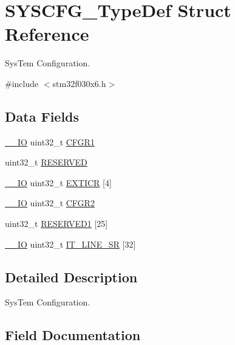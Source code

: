 \hypertarget{struct_s_y_s_c_f_g___type_def}{}\section{S\+Y\+S\+C\+F\+G\+\_\+\+Type\+Def Struct Reference}
\label{struct_s_y_s_c_f_g___type_def}


Sys\+Tem Configuration.  




{\ttfamily \#include $<$stm32f030x6.\+h$>$}

\subsection*{Data Fields}
\begin{DoxyCompactItemize}
\item 
\hyperlink{core__sc300_8h_aec43007d9998a0a0e01faede4133d6be}{\+\_\+\+\_\+\+IO} uint32\+\_\+t \hyperlink{struct_s_y_s_c_f_g___type_def_a7a12ab903dcfa91c96beb2e36562eed6}{C\+F\+G\+R1}
\item 
uint32\+\_\+t \hyperlink{struct_s_y_s_c_f_g___type_def_a0e5030971ec1bfd3101f83f546493c83}{R\+E\+S\+E\+R\+V\+ED}
\item 
\hyperlink{core__sc300_8h_aec43007d9998a0a0e01faede4133d6be}{\+\_\+\+\_\+\+IO} uint32\+\_\+t \hyperlink{struct_s_y_s_c_f_g___type_def_af18ed332be387d38ef90cccdfd3f78fc}{E\+X\+T\+I\+CR} \mbox{[}4\mbox{]}
\item 
\hyperlink{core__sc300_8h_aec43007d9998a0a0e01faede4133d6be}{\+\_\+\+\_\+\+IO} uint32\+\_\+t \hyperlink{struct_s_y_s_c_f_g___type_def_ad587bd6f59142b90c879b7c8aaf1bb8c}{C\+F\+G\+R2}
\item 
uint32\+\_\+t \hyperlink{struct_s_y_s_c_f_g___type_def_af255aae9744713ab5aa5bd3951f22a05}{R\+E\+S\+E\+R\+V\+E\+D1} \mbox{[}25\mbox{]}
\item 
\hyperlink{core__sc300_8h_aec43007d9998a0a0e01faede4133d6be}{\+\_\+\+\_\+\+IO} uint32\+\_\+t \hyperlink{struct_s_y_s_c_f_g___type_def_a36d57c94f151100a15485a6cbbdf60e8}{I\+T\+\_\+\+L\+I\+N\+E\+\_\+\+SR} \mbox{[}32\mbox{]}
\end{DoxyCompactItemize}


\subsection{Detailed Description}
Sys\+Tem Configuration. 

\subsection{Field Documentation}
\mbox{\label{struct_s_y_s_c_f_g___type_def_a7a12ab903dcfa91c96beb2e36562eed6}} 

